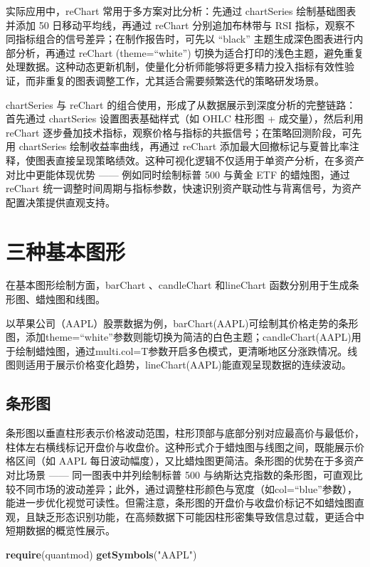 \documentclass[]{ctexbook}
\newenvironment{Shaded}{\begin{snugshade}}{\end{snugshade}}
\newcommand{\FunctionTok}[1]{\textcolor[rgb]{0.13,0.29,0.53}{\textbf{#1}}}
\newcommand{\NormalTok}[1]{#1}
\newcommand{\StringTok}[1]{\textcolor[rgb]{0.31,0.60,0.02}{#1}}
\begin{document}
实际应用中，reChart 常用于多方案对比分析：先通过 chartSeries 绘制基础图表并添加 50 日移动平均线，再通过 reChart 分别追加布林带与 RSI 指标，观察不同指标组合的信号差异；在制作报告时，可先以 ``black'' 主题生成深色图表进行内部分析，再通过 reChart (theme=``white'') 切换为适合打印的浅色主题，避免重复处理数据。这种动态更新机制，使量化分析师能够将更多精力投入指标有效性验证，而非重复的图表调整工作，尤其适合需要频繁迭代的策略研发场景。

chartSeries 与 reChart 的组合使用，形成了从数据展示到深度分析的完整链路：首先通过 chartSeries 设置图表基础样式（如 OHLC 柱形图 + 成交量），然后利用 reChart 逐步叠加技术指标，观察价格与指标的共振信号；在策略回测阶段，可先用 chartSeries 绘制收益率曲线，再通过 reChart 添加最大回撤标记与夏普比率注释，使图表直接呈现策略绩效。这种可视化逻辑不仅适用于单资产分析，在多资产对比中更能体现优势 ------ 例如同时绘制标普 500 与黄金 ETF 的蜡烛图，通过 reChart 统一调整时间周期与指标参数，快速识别资产联动性与背离信号，为资产配置决策提供直观支持。

\section{三种基本图形}\label{ux4e09ux79cdux57faux672cux56feux5f62}

在基本图形绘制方面，barChart 、candleChart 和lineChart 函数分别用于生成条形图、蜡烛图和线图。

以苹果公司（AAPL）股票数据为例，barChart(AAPL)可绘制其价格走势的条形图，添加theme=``white''参数则能切换为简洁的白色主题；candleChart(AAPL)用于绘制蜡烛图，通过multi.col=T参数开启多色模式，更清晰地区分涨跌情况。线图则适用于展示价格变化趋势，lineChart(AAPL)能直观呈现数据的连续波动。

\subsection{条形图}\label{ux6761ux5f62ux56fe}

条形图以垂直柱形表示价格波动范围，柱形顶部与底部分别对应最高价与最低价，柱体左右横线标记开盘价与收盘价。这种形式介于蜡烛图与线图之间，既能展示价格区间（如 AAPL 每日波动幅度），又比蜡烛图更简洁。条形图的优势在于多资产对比场景 ------ 同一图表中并列绘制标普 500 与纳斯达克指数的条形图，可直观比较不同市场的波动差异；此外，通过调整柱形颜色与宽度（如col=``blue''参数），能进一步优化视觉可读性。但需注意，条形图的开盘价与收盘价标记不如蜡烛图直观，且缺乏形态识别功能，在高频数据下可能因柱形密集导致信息过载，更适合中短期数据的概览性展示。

\begin{Shaded}
\begin{Highlighting}[]
\FunctionTok{require}\NormalTok{(quantmod)}
\FunctionTok{getSymbols}\NormalTok{(}\StringTok{"AAPL"}\NormalTok{)}
\end{Highlighting}
\end{Shaded}
\end{document}

